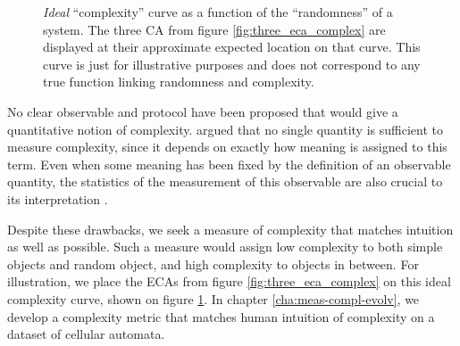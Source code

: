 \begin{figure}[htbp]
  \centering
\caption{\emph{Ideal} ``complexity'' curve as a function of the ``randomness''
  of a system. The three \ac{CA} from figure \ref{fig:three_eca_complex} are
  displayed at their approximate expected location on that curve. This curve is
  just for illustrative purposes and does not correspond to any true function
  linking randomness and complexity.}
\label{fig:complexity_curve}
\end{figure}

No clear observable and protocol have been proposed that would give a
quantitative notion of complexity.
\textcite{grassbergerProblemsQuantifyingSelfgenerated1989} argued that no single
quantity is sufficient to measure complexity, since it depends on exactly how
meaning is assigned to this term. Even when some meaning has been fixed by the
definition of an observable quantity, the statistics of the measurement of this
observable are also crucial to its interpretation
\parencite{gutowitzCellularAutomataSciences1995}.

Despite these drawbacks, we seek a measure of complexity that matches intuition
as well as possible. Such a measure would assign low complexity to both simple
objects and random object, and high complexity to objects in between. For
illustration, we place the \acp{ECA} from figure \ref{fig:three_eca_complex} on
this ideal complexity curve, shown on figure \ref{fig:complexity_curve}. In
chapter \ref{cha:meas-compl-evolv}, we develop a complexity metric that matches
human intuition of complexity on a dataset of cellular automata.

